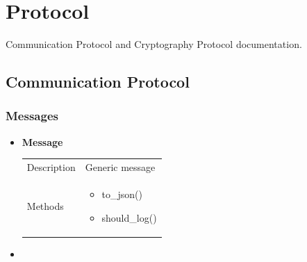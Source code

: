 \documentclass[11pt]{article}
\begin{document}
\section{Protocol}\label{protocol}


Communication Protocol and Cryptography Protocol documentation.

\subsection{Communication Protocol}\label{communication-protocol}

\subsubsection{Messages}\label{messages}

\begin{itemize}
\item
  \textbf{Message} 
  \begin{longtable}[]{@{}ll@{}}
  \toprule
  \endhead
  \begin{minipage}[t]{0.40\columnwidth}\raggedright
  Description\strut
  \end{minipage} & \begin{minipage}[t]{0.54\columnwidth}\raggedright
  Generic message\strut
  \end{minipage}\tabularnewline
  \begin{minipage}[t]{0.40\columnwidth}\raggedright
  Methods\strut
  \end{minipage} & \begin{minipage}[t]{0.54\columnwidth}\raggedright
  \begin{itemize}
  	\item to\_json()
  	\item should\_log()
  \end{itemize}\strut
  \end{minipage}\tabularnewline
  \bottomrule
  \end{longtable}

\item


\end{itemize}
\end{document}
